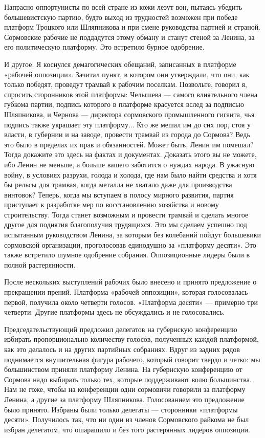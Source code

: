 \documentclass[12pt, a4paper, openany]{book}
\begin{document}
Напрасно оппортунисты по всей стране из кожи лезут вон, пытаясь убедить большевистскую партию, будто выход из трудностей возможен при победе платформ Троцкого или Шляпникова и при смене руководства партией и страной. Сормовские рабочие не поддадутся этому обману и станут стеной за Ленина, за его политическую платформу. Это встретило бурное одобрение.

И другое. Я коснулся демагогических обещаний, записанных в платформе «рабочей оппозиции». Зачитал пункт, в котором они утверждали, что они, как только победят, проведут трамвай к рабочим поселкам. Позвольте, говорил я, спросить сторонников этой платформы: Челышева — самого влиятельного члена губкома партии, подпись которого в платформе красуется вслед за подписью Шляпникова, и Чернова — директора сормовского промышленного гиганта, чья подпись также украшает эту платформу... Кто же мешал им до сих пор, стоя у власти, в губернии и на заводе, провести трамвай из города до Сормова? Ведь это было в пределах их прав и обязанностей. Может быть, Ленин им помешал? Тогда докажите это здесь на фактах и документах. Доказать этого вы не можете, ибо Ленин не меньше, а больше вашего заботится о нуждах народа. В ужасную войну, в условиях разрухи, голода и холода, где нам было найти средства и хотя бы рельсы для трамвая, когда металла не хватало даже для производства винтовок? Теперь, когда мы вступаем в полосу мирного развития, партия приступает к разработке мер по восстановлению хозяйства и новому строительству. Тогда станет возможным и провести трамвай и сделать многое другое для поднятия благополучия трудящихся. Это мы сделаем успешно под испытанным руководством Ленина, за которым без колебаний пойдут большевики сормовской организации, проголосовав единодушно за «платформу десяти». Это также встретило шумное одобрение собрания. Оппозиционные лидеры были в полной растерянности.

После нескольких выступлений рабочих было внесено и принято предложение о прекращении прений. Платформа «рабочей оппозиции», которая голосовалась первой, получила около четверти голосов. «Платформа десяти» — примерно три четверти. Другие платформы здесь не обсуждались и не голосовались.

Председательствующий предложил делегатов на губернскую конференцию избирать пропорционально количеству голосов, полученных каждой платформой, как это делалось и на других партийных собраниях. Вдруг из задних рядов поднимается внушительная фигура рабочего, который говорит твердо и четко: мы большинством приняли платформу Ленина. На губернскую конференцию от Сормова надо выбирать только тех, которые поддерживают волю большинства. Нам не гоже, чтобы на конференции одни сормовичи говорили за платформу Ленина, а другие за платформу Шляпникова. Голосованием это предложение было принято. Избраны были только делегаты — сторонники «платформы десяти». Получилось так, что ни один из членов Сормовского райкома не был избран делегатом, что ошарашило и без того растерянных лидеров оппозиции.
\end{document}
